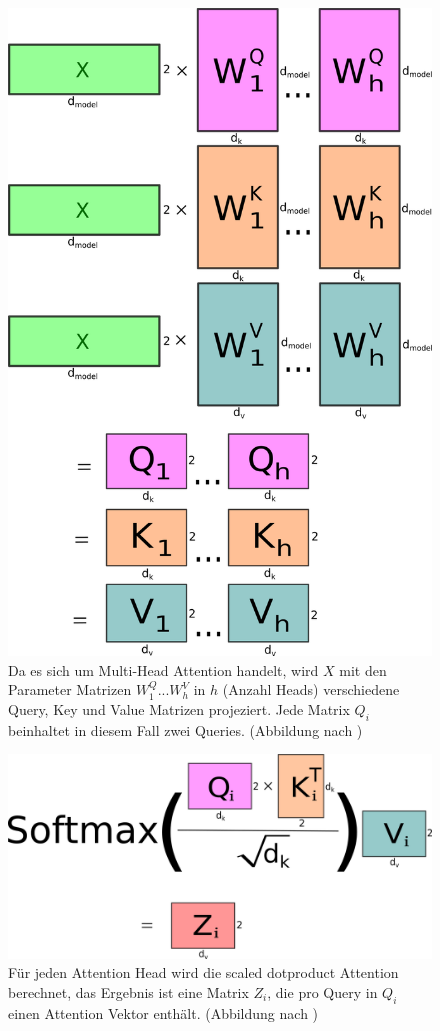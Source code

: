 \documentclass[conference]{IEEEtran}
\begin{document}
\begin{figure}[htbp]
\includegraphics[width=\linewidth]{img/vis2.png}
\caption{Da es sich um Multi-Head Attention handelt, wird $X$ mit den Parameter Matrizen $W^Q_1 ... W^V_h$ in $h$ (Anzahl Heads) verschiedene Query, Key und Value Matrizen projeziert. Jede Matrix $Q_i$ beinhaltet in diesem Fall zwei Queries. (Abbildung nach \cite{illustrated_transformer})}
\label{vis:2}
\end{figure}

\begin{figure}[htbp]
\includegraphics[width=\linewidth]{img/vis3.png}
\caption{Für jeden Attention Head wird die scaled dotproduct Attention berechnet, das Ergebnis ist eine Matrix $Z_i$, die pro Query in $Q_i$ einen Attention Vektor enthält. (Abbildung nach \cite{illustrated_transformer})}
\label{vis:3}
\end{figure}
\end{document}
